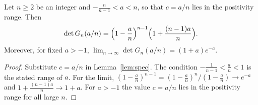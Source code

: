 \begin{theorem}\label{thm:main}
Let $n\ge2$ be an integer and $-\tfrac{n}{n-1}<a<n$, so that $c=a/n$ lies in the positivity range. Then
\[
\det G_n(a/n)=\Bigl(1-\frac an\Bigr)^{n-1}\Bigl(1+\frac{(n-1)a}{n}\Bigr).
\]
Moreover, for fixed $a>-1$, $\displaystyle\lim_{n\to\infty}\det G_n(a/n)=(1+a)e^{-a}$.
\end{theorem}
\begin{proof}
Substitute $c=a/n$ in Lemma~\ref{lem:spec}.
The condition $-\frac1{n-1}<\frac an<1$ is the stated range of $a$.
For the limit, $(1-\frac an)^{n-1}=(1-\frac an)^n/(1-\frac an)\to e^{-a}$ and $1+\frac{(n-1)a}{n}\to1+a$. For $a>-1$ the value $c=a/n$ lies in the positivity range for all large $n$.
\end{proof}

